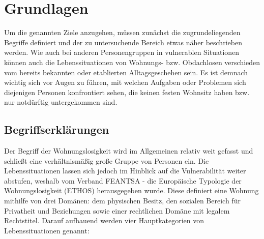 \chapter{Grundlagen}\label{ch:preliminaries}

Um die genannten Ziele anzugehen, müssen zunächst die zugrundeliegenden Begriffe definiert und der zu untersuchende Bereich etwas näher beschrieben werden. Wie auch bei anderen Personengruppen in vulnerablen Situationen können auch die Lebenssituationen von Wohnungs- bzw. Obdachlosen verschieden vom bereits bekannten oder etablierten Alltagsgeschehen sein. Es ist demnach wichtig sich vor Augen zu führen, mit welchen Aufgaben oder Problemen sich diejenigen Personen konfrontiert sehen, die keinen festen Wohnsitz haben bzw. nur notdürftig untergekommen sind.

\section{Begriffserklärungen}

Der Begriff der Wohnungslosigkeit wird im Allgemeinen relativ weit gefasst und schließt eine verhältnismäßig große Gruppe von Personen ein. Die Lebenssituationen lassen sich jedoch im Hinblick auf die Vulnerabilität weiter abstufen, weshalb vom Verband FEANTSA - \citet{ethos} die Europäische Typologie der Wohnungslosigkeit (ETHOS) herausgegeben wurde. Diese definiert eine Wohnung mithilfe von drei Domänen: dem physischen Besitz, den sozialen Bereich für Privatheit und Beziehungen sowie einer rechtlichen Domäne mit legalem Rechtstitel. Darauf aufbauend werden vier Hauptkategorien von Lebenssituationen genannt:

